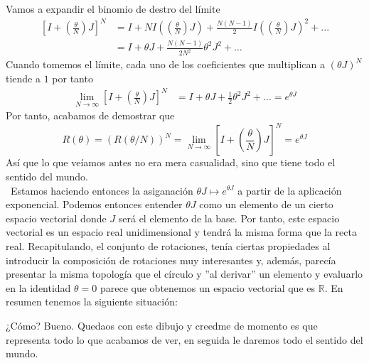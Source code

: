 \documentclass[12pt]{article}
\begin{document}
Vamos a expandir el binomio de destro del límite
\begin{equation*}
    \begin{split}
        \left[I + \left(\frac{\theta}{N} \right) J\right]^N & = I+ N I \left(\left(\frac{\theta}{N} \right) J\right) +\frac{N(N-1)}{2}I \left(\left(\frac{\theta}{N} \right) J\right)^2+... \\ 
        & = I+\theta J +\frac{N(N-1)}{2 N^2}\theta^2 J^2+ \dots 
    \end{split}
    \end{equation*}
Cuando tomemos el límite, cada uno de los coeficientes que multiplican a $(\theta J)^N$ tiende a $1$ por tanto 
\begin{equation*}
    \begin{split}
        \lim_{N\rightarrow \infty} \left[I + \left(\frac{\theta}{N} \right) J\right]^N & = I+\theta J+ \frac{1}{2}\theta^2 J^2 +... =e^{\theta J}
    \end{split}
\end{equation*}
Por tanto, acabamos de demostrar que
\begin{equation}
     R(\theta) = (R(\theta/N))^N= \lim_{N\rightarrow \infty} \left[I + \left(\frac{\theta}{N} \right) J\right]^N =e^{\theta J}
\end{equation}
Así que  lo que veíamos antes no era mera casualidad, sino que tiene todo el sentido del mundo. \\\
Estamos haciendo entonces la asiganación $\theta J \mapsto e^{\theta J} $ a partir de la aplicación exponencial. Podemos entonces entender $\theta J$ como un elemento de un cierto espacio vectorial donde $J$ será el elemento de la base. Por tanto, este espacio vectorial es un espacio real unidimensional y tendrá la misma forma que la recta real. Recapitulando, el conjunto de rotaciones, tenía ciertas propiedades al introducir la composición de rotaciones muy interesantes y, además, parecía presentar la misma topología que el círculo y ''al derivar'' un elemento y evaluarlo en la identidad $\theta =0$ parece que obtenemos un espacio vectorial que es $\mathbb{R}$. En resumen tenemos la siguiente situación:
\begin{center}
\end{center} 
¿Cómo? Bueno. Quedaos con este dibujo y creedme de momento es que representa todo lo que acabamos de ver, en seguida le daremos todo el sentido del mundo.
\end{document}
